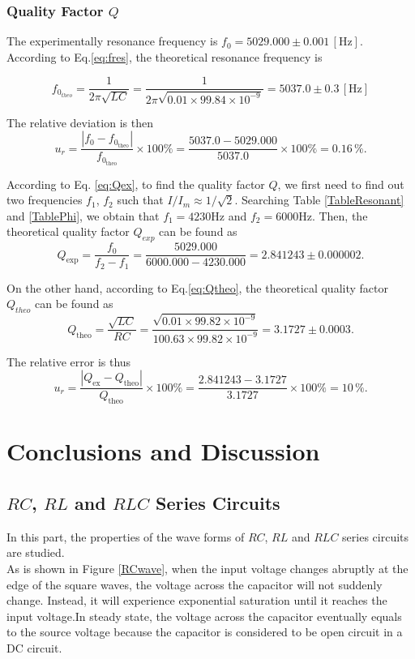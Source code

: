 \documentclass{article}
\begin{document}
\subsubsection{Quality Factor $Q$}

The experimentally resonance frequency is $f_0 = 5029.000\pm 0.001\,[\text{Hz}]$. According to Eq.\eqref{eq:fres}, the theoretical resonance frequency is

$$f_{0_{theo}} = \frac{1}{2\pi\sqrt{LC}} = \frac{1}{2\pi \sqrt{0.01\times 99.84\times 10^{-9}}} = 5037.0\pm 0.3\,[\text{Hz}]$$

The relative deviation is then
$$u_{r} = \frac{|f_0 - f_{0_{\text{theo}}}|}{f_{0_{\text{theo}}}} \times 100\% = \frac{5037.0 - 5029.000}{5037.0} \times 100\% = 0.16\,\%.$$

According to Eq. \eqref{eq:Qex}, to find the quality factor $Q$, we first need to find out two frequencies $f_1$, $f_2$ such that $I/I_m \approx 1/\sqrt{2}$. Searching Table \ref{TableResonant} and \ref{TablePhi}, we obtain that $f_1 = 4230 \text{Hz}$ and $f_2 = 6000 \text{Hz}$. Then, the theoretical quality factor $Q_{exp}$ can be found as
$$Q_{\text{exp}} = \frac{f_0}{f_2 - f_1} = \frac{5029.000}{6000.000-4230.000} = 2.841243 \pm 0.000002.$$

On the other hand, according to Eq.\eqref{eq:Qtheo}, the theoretical quality factor $Q_{theo}$ can be found as
$$Q_{\text{theo}} = \frac{\sqrt{LC}}{RC} = \frac{\sqrt{0.01\times 99.82\times 10^{-9}}}{100.63\times 99.82\times 10^{-9}} = 3.1727 \pm 0.0003.$$

The relative error is thus
$$u_r = \frac{|Q_{\text{ex}} - Q_{\text{theo}}|}{Q_{\text{theo}}} \times 100\% = \frac{2.841243 - 3.1727}{3.1727} \times 100\% = 10\,\%.$$

\section{Conclusions and Discussion}

\subsection{$RC$, $RL$ and $RLC$ Series Circuits}

In this part, the properties of the wave forms of $RC$, $RL$ and $RLC$ series circuits are studied. \\

As is shown in Figure \ref{RCwave}, when the input voltage changes abruptly at the edge of the square waves, the voltage across the capacitor will not suddenly change. Instead, it will experience exponential saturation until it reaches the input voltage.In steady state, the voltage across the capacitor eventually equals to the source voltage because the capacitor is considered to be open circuit in a DC circuit. 
\end{document}
